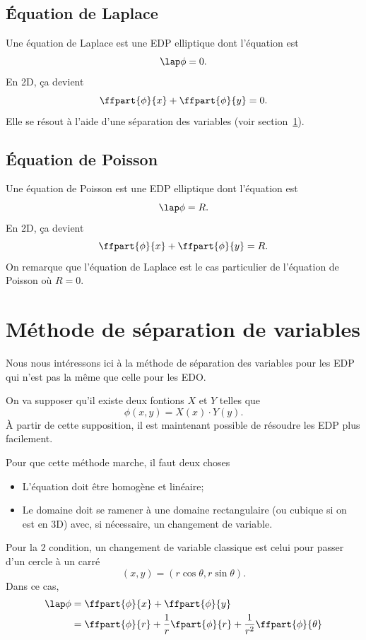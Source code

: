 \subsection{Équation de Laplace}
Une équation de Laplace est une EDP elliptique dont l'équation est
\[ \lap \phi = 0. \]
En 2D, ça devient
\[ \ffpart{\phi}{x} + \ffpart{\phi}{y} = 0. \]
Elle se résout à l'aide d'une séparation des variables
(voir section~\ref{sec:sepvar}).


\subsection{Équation de Poisson}
Une équation de Poisson est une EDP elliptique dont l'équation est
\[ \lap \phi = R. \]
En 2D, ça devient
\[ \ffpart{\phi}{x} + \ffpart{\phi}{y} = R. \]
On remarque que l'équation de Laplace est le cas particulier de
l'équation de Poisson où $R = 0$.

\section{Méthode de séparation de variables}
\label{sec:sepvar}
Nous nous intéressons ici à la méthode de séparation des variables pour les EDP
qui n'est pas la même que celle pour les EDO.

On va supposer qu'il existe deux fontions $X$ et $Y$ telles que
\[ \phi(x, y) = X(x) \cdot Y(y). \]
À partir de cette supposition, il est maintenant possible de résoudre
les EDP plus facilement.

Pour que cette méthode marche, il faut deux choses
\begin{itemize}
  \item L'équation doit être homogène et linéaire;
  \item Le domaine doit se ramener à une domaine rectangulaire
    (ou cubique si on est en 3D)
    avec, si nécessaire, un changement de variable.
\end{itemize}
Pour la 2\ieme{} condition, un changement de variable classique est
celui pour passer d'un cercle à un carré
\[ (x, y) = (r\cos\theta, r\sin\theta). \]
Dans ce cas,
\begin{align*}
  \lap \phi & = \ffpart{\phi}{x} + \ffpart{\phi}{y}\\
  & = \ffpart{\phi}{r} + \frac{1}{r}\fpart{\phi}{r}
  + \frac{1}{r^2}\ffpart{\phi}{\theta}
\end{align*}


